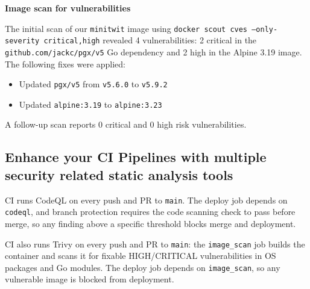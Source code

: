 \textbf{Image scan for vulnerabilities}

The initial scan of our \texttt{minitwit} image using \texttt{docker scout cves --only-severity critical,high} revealed 4 vulnerabilities: 2 critical in the \texttt{github.com/jackc/pgx/v5} Go dependency and 2 high in the Alpine 3.19 image. The following fixes were applied:
\begin{itemize}[noitemsep]
    \item Updated \texttt{pgx/v5} from \texttt{v5.6.0} to \texttt{v5.9.2}
    \item Updated \texttt{alpine:3.19} to \texttt{alpine:3.23}
\end{itemize}

A follow-up scan reports 0 critical and 0 high risk vulnerabilities.

\subsection{Enhance your CI Pipelines with multiple security related static analysis tools}

CI runs CodeQL on every push and PR to \texttt{main}. The deploy job depends on \texttt{codeql}, and branch protection requires the code scanning check to pass before merge, so any finding above a specific threshold blocks merge and deployment. 

CI also runs Trivy on every push and PR to \texttt{main}: the \texttt{image\_scan} job builds the container and scans it for fixable HIGH/CRITICAL vulnerabilities in OS packages and Go modules. The deploy job depends on \texttt{image\_scan}, so any vulnerable image is blocked from deployment.
